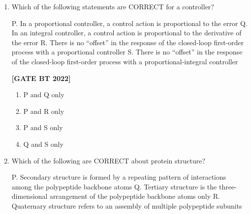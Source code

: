 \documentclass[12pt]{article}
\begin{document}
\begin{enumerate}[leftmargin=2.5em, label=\textbf{Q.\arabic*}., itemsep=2em, resume]
\noindent \textbf{[GATE BT 2022]}
\[
\begin{array}{ll}
\text{Column I} & \text{Column II} \\
P. \ \text{Protein A} & 1. \ \text{Size exclusion chromatography} \\
Q. \ \text{Sephadex} & 2. \ \text{Ion-exchange chromatography} \\
R. \ \text{Phenylsepharose} & 3. \ \text{Affinity chromatography} \\
S. \ \text{Diethylaminoethyl cellulose} & 4. \ \text{Hydrophobic interaction chromatography}
\end{array}
\]
\begin{multicols}{2}
\begin{enumerate}
    \item P-1, Q-4, R-2, S-3
    \item P-3, Q-1, R-4, S-2
    \item P-3, Q-4, R-2, S-1
    \item P-4, Q-1, R-3, S-2
\end{enumerate}
\end{multicols}

\item Which of the following statements are CORRECT for a controller?  

P. In a proportional controller, a control action is proportional to the error  
Q. In an integral controller, a control action is proportional to the derivative of the error  
R. There is no ``offset'' in the response of the closed-loop first-order process with a proportional controller  
S. There is no ``offset'' in the response of the closed-loop first-order process with a proportional-integral controller  

\noindent \textbf{[GATE BT 2022]}
\begin{multicols}{2}
\begin{enumerate}
    \item P and Q only
    \item P and R only
    \item P and S only
    \item Q and S only
\end{enumerate}
\end{multicols}

\item Which of the following are CORRECT about protein structure?  

P. Secondary structure is formed by a repeating pattern of interactions among the polypeptide backbone atoms  
Q. Tertiary structure is the three-dimensional arrangement of the polypeptide backbone atoms only  
R. Quaternary structure refers to an assembly of multiple polypeptide subunits  


\end{enumerate}
\end{document}
